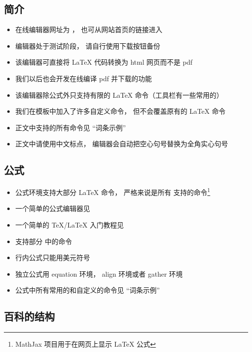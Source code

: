 
\subsection{简介}
\begin{itemize}
\item 在线编辑器网址为 ， 也可从网站首页的链接进入
\item 编辑器处于测试阶段， 请自行使用下载按钮备份
\item 该编辑器可直接将 LaTeX 代码转换为 html 网页而不是 pdf
\item 我们以后也会开发在线编译 pdf 并下载的功能
\item 该编辑器除公式外只支持有限的 LaTeX 命令（工具栏有一些常用的）
\item 我们在模板中加入了许多自定义命令， 但不会覆盖原有的 LaTeX 命令
\item 正文中支持的所有命令见 “词条示例”
\item 正文中请使用中文标点， 编辑器会自动把空心句号替换为全角实心句号
\end{itemize}

\subsection{公式}
\begin{itemize}
\item 公式环境支持大部分 LaTeX 命令， 严格来说是所有  支持的命令\footnote{MathJax 项目用于在网页上显示 LaTeX 公式}
\item 一个简单的公式编辑器见
\item 一个简单的 TeX/LaTeX 入门教程见
\item 支持部分 中的命令
\item 行内公式只能用美元符号
\item 独立公式用 equation 环境， align 环境或者 gather 环境
\item 公式中所有常用的和自定义的命令见 “词条示例”
\end{itemize}

\subsection{百科的结构}

